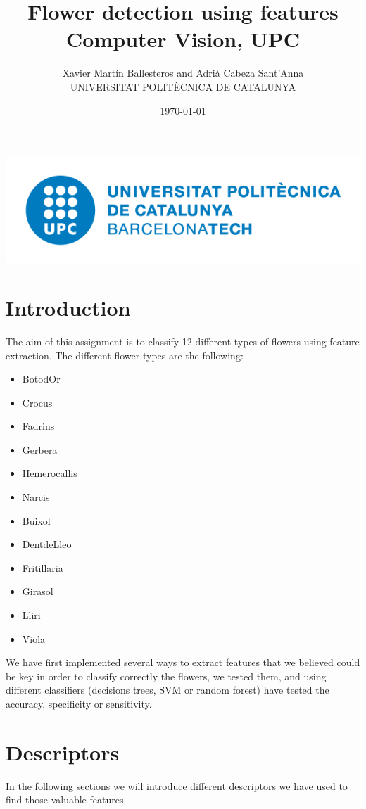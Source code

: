 \documentclass[11]{article}
\author{Xavier Martín Ballesteros and Adrià Cabeza Sant'Anna \\ \small UNIVERSITAT POLITÈCNICA DE CATALUNYA}
\title{Flower detection using features\\ \large{Computer Vision, UPC}}
\date{\today}
\begin{document}
\maketitle
\vspace*{\fill}
\begin{center}
\includegraphics[scale=0.4]{UPClogo.png}\par\vspace{1cm}
\end{center}
\newpage
\tableofcontents
\newpage 

\section{Introduction}
The aim of this assignment is to classify 12 different types of flowers using feature extraction. The different flower types are the following:
\begin{multicols}{3}
\begin{itemize}
\item BotodOr 
\item Crocus  
\item Fadrins   
\item Gerbera 
\item Hemerocallis 
\item Narcis
\item Buixol
\item DentdeLleo 
\item Fritillaria  
\item Girasol 
\item Lliri     
\item Viola

\end{itemize}
\end{multicols}

We have first implemented several ways to extract features that we believed could be key in order to classify correctly the flowers, we tested them, and using different classifiers (decisions trees, SVM or random forest) have tested the accuracy, specificity or sensitivity. 

\section{Descriptors}
\label{sec:desc}
In the following sections we will introduce different descriptors we have used to find those valuable features.
\end{document}
